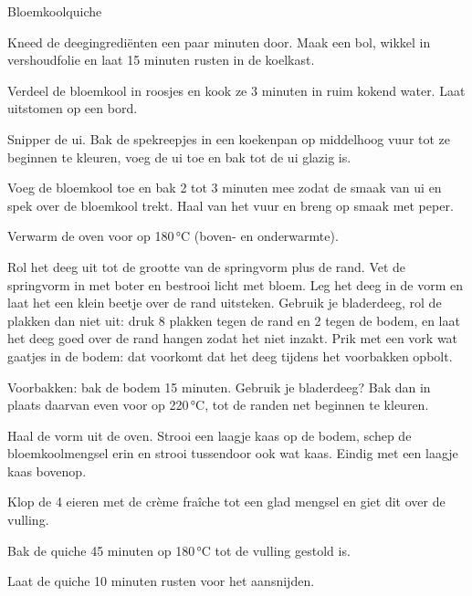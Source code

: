 \begin{recipe}{Bloemkoolquiche}
\begin{steps}
  \item Kneed de deegingrediënten een paar minuten door. Maak een bol, wikkel
        in vershoudfolie en laat 15 minuten rusten in de koelkast.
  \item Verdeel de bloemkool in roosjes en kook ze 3 minuten in ruim kokend
        water. Laat uitstomen op een bord.
  \item Snipper de ui. Bak de spekreepjes in een koekenpan op middelhoog vuur
        tot ze beginnen te kleuren, voeg de ui toe en bak tot de ui glazig is.
  \item Voeg de bloemkool toe en bak 2 tot 3 minuten mee zodat de smaak van
        ui en spek over de bloemkool trekt. Haal van het vuur en breng op
        smaak met peper.
  \item Verwarm de oven voor op 180\,°C (boven- en onderwarmte).
  \item Rol het deeg uit tot de grootte van de springvorm plus de rand. Vet de
        springvorm in met boter en bestrooi licht met bloem. Leg het deeg in de
        vorm en laat het een klein beetje over de rand uitsteken. Gebruik je
        bladerdeeg, rol de plakken dan niet uit: druk 8 plakken tegen de rand
        en 2 tegen de bodem, en laat het deeg goed over de rand hangen zodat
        het niet inzakt. Prik met een vork wat gaatjes in de bodem: dat
        voorkomt dat het deeg tijdens het voorbakken opbolt.
  \item Voorbakken: bak de bodem 15 minuten. Gebruik je bladerdeeg? Bak dan in
        plaats daarvan even voor op 220\,°C, tot de randen net beginnen te
        kleuren.
  \item Haal de vorm uit de oven. Strooi een laagje kaas op de bodem, schep de
        bloemkoolmengsel erin en strooi tussendoor ook wat kaas. Eindig met een
        laagje kaas bovenop.
  \item Klop de 4 eieren met de crème fraîche tot een glad mengsel en giet dit
        over de vulling.
  \item Bak de quiche 45 minuten op 180\,°C tot de vulling gestold is.
  \item Laat de quiche 10 minuten rusten voor het aansnijden.
\end{steps}

\end{recipe}
